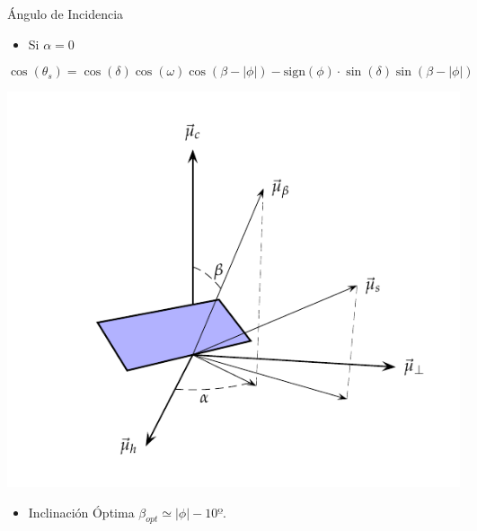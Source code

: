 \documentclass[xcolor={usenames,svgnames,dvipsnames}]{beamer}
\begin{document}
\begin{frame}[plain,label={sec:org24a8fc6}]{Ángulo de Incidencia}
\begin{itemize}
\item Si \(\alpha=0\)
\end{itemize}
\[
\cos(\theta_{s}) = \cos(\delta)\cos(\omega)\cos(\beta-|\phi|)- \mathrm{sign}(\phi)\cdot\sin(\delta)\sin(\beta-|\phi|)
\]

\begin{center}
\includegraphics[height=0.6\textheight]{../figs/AngulosSistemaEstatico.pdf}
\end{center}

\begin{itemize}
\item Inclinación Óptima \(\beta_{opt} \simeq |\phi| - 10º\).
\end{itemize}
\end{frame}
\end{document}
